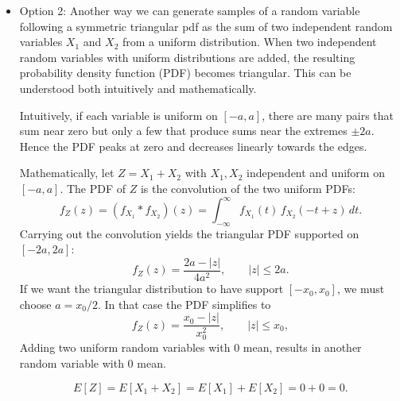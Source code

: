 \documentclass[11pt,a4paper]{article}
\begin{document}
\begin{itemize}
\begin{lstlisting}[language=Matlab]
            % valores teoricos
            % theo_mean = 0; % simetria centrado en 0
            theo_var = (A^2 + B^2 + C^2 - A*B - A*C - B*C)/18;
            rms = 20*log10(sqrt(theo_var)/x0);

            fprintf('Theorical mean: 0; emp mean: %.2f\n',emp_mean);
            fprintf('Theorical var: %.2f; emp var: %.2f\n',theo_var,emp_var);
            fprintf('Sigma value: %.2f\n',sqrt(theo_var));
            fprintf('rms value in dBFS: %.2f\n',rms)

            % ver histograma y pdf teorica
            xgrid = linspace(A,C,500)';
            figure
            histogram(samples,100,'Normalization','pdf')
            hold on
            plot(xgrid, pdf(pd,xgrid), 'LineWidth',1.5)
            title('Triangular (media 0) -- muestras vs PDF')
            hold off
        \end{lstlisting}

    \item Option 2: Another way we can generate samples of a random variable following a symmetric triangular pdf as the sum of two independent random variables $X_1$ and $X_2$ from a uniform distribution.
    When two independent random variables with uniform distributions are added, the resulting probability density function (PDF) becomes triangular. This can be understood both intuitively and mathematically.

    Intuitively, if each variable is uniform on \([-a,a]\), there are many pairs that sum near zero but only a few that produce sums near the extremes \(\pm 2a\). Hence the PDF peaks at zero and decreases linearly towards the edges.
    
    Mathematically, let \(Z = X_1 + X_2\) with \(X_1,X_2\) independent and uniform on \([-a,a]\). The PDF of \(Z\) is the convolution of the two uniform PDFs:
    \[
    f_Z(z) = (f_{X_1} * f_{X_2})(z) = \int_{-\infty}^{\infty} f_{X_1}(t)\, f_{X_2}(-t + z)\, dt.
    \]
    Carrying out the convolution yields the triangular PDF supported on \([-2a,2a]\):
    \[
    f_Z(z) = \frac{2a - |z|}{4a^{2}}, \qquad |z|\le 2a.
    \]
    If we want the triangular distribution to have support \([-x_0,x_0]\), we must choose \(a = x_0/2\). In that case the PDF simplifies to
    \[
    f_Z(z)=\frac{x_0 - |z|}{x_0^2}, \qquad |z|\le x_0,
    \]
    Adding two uniform random variables with 0 mean, results in another random variable with 0 mean.

    \[
    E[Z] = E[X_1 + X_2] = E[X_1] + E[X_2] = 0 + 0 = 0.
    \]


\end{itemize}
\end{document}
